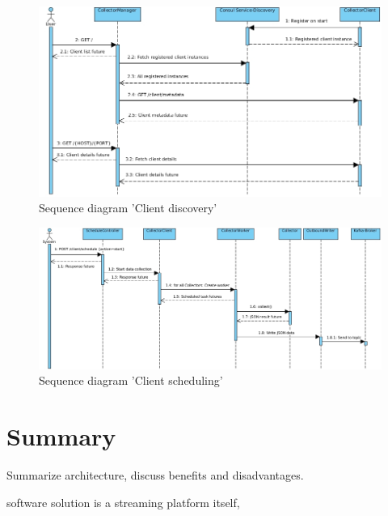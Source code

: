 \begin{figure}[H]
	\centering
	\includegraphics[width=1.0\textwidth]{../uml/sequence-discovery.jpg}
	\caption{Sequence diagram 'Client discovery'}
	\label{fig:sequence-client-discovery}
\end{figure}

\begin{figure}[H]
 	\centering
 	\includegraphics[width=1.0\textwidth]{../uml/sequence-scheduling.jpg}
 	\caption{Sequence diagram 'Client scheduling'}
 	\label{fig:sequence-client-scheduling}
 \end{figure}

\section{Summary}

Summarize architecture, discuss benefits and disadvantages.

software solution is a streaming platform itself,


